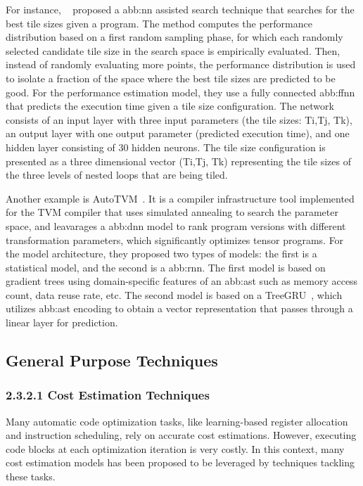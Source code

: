             For instance, ~\cite{nntile} proposed a \gls{abb:nn} assisted search technique that searches for the best tile sizes given a program. The method computes the performance distribution based on a first random sampling phase, for which each randomly selected candidate tile size in the search space is empirically evaluated. Then, instead of randomly evaluating more points, the performance distribution is used to isolate a fraction of the space where the best tile sizes are predicted to be good.  For the performance estimation model, they use a fully connected \gls{abb:ffnn} that predicts the execution time given a tile size configuration. The network consists of an input layer with three input parameters (the tile sizes: Ti,Tj, Tk), an output layer with one output parameter (predicted execution time), and one hidden layer consisting of 30 hidden neurons.  The tile size configuration is presented as a three dimensional vector (Ti,Tj, Tk) representing the tile sizes of the three levels of nested loops that are being tiled. 
            
            Another example is AutoTVM~\cite{autotvm}. It is a compiler infrastructure tool implemented for the TVM compiler that uses simulated annealing to search the parameter space, and leavarages a \gls{abb:dnn} model to rank program versions with different transformation parameters, which significantly optimizes tensor programs. 
            For the model architecture, they proposed two types of models: the first is a statistical model, and the second is a \gls{abb:rnn}. The first model is based on gradient trees using domain-specific features of an \gls{abb:ast} such as memory access count, data reuse rate, etc. The second model is based on a TreeGRU~\cite{treegru}, which utilizes \gls{abb:ast} encoding to obtain a vector representation that passes through a linear layer for prediction.
        

    \subsection{General Purpose Techniques}

        \subsubsection{2.3.2.1   Cost Estimation Techniques}
            Many automatic code optimization tasks, like learning-based register allocation and instruction scheduling, rely on accurate cost estimations. However, executing code blocks at each optimization iteration is very costly. In this context, many cost estimation models has been proposed to be leveraged by techniques tackling these tasks. 
            
